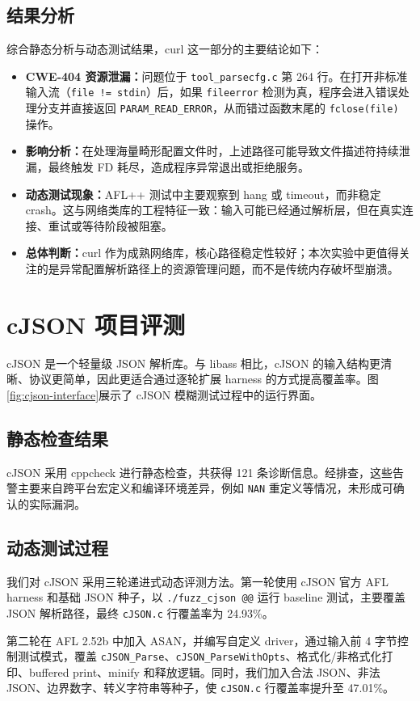 \documentclass[UTF8,a4paper,zihao=-4]{ctexart}
\begin{document}
\subsection{结果分析}
综合静态分析与动态测试结果，curl 这一部分的主要结论如下：
\begin{itemize}[leftmargin=2em]
  \item \textbf{CWE-404 资源泄漏：}问题位于 \texttt{tool\_parsecfg.c} 第 264 行。在打开非标准输入流（\texttt{file != stdin}）后，如果 \texttt{fileerror} 检测为真，程序会进入错误处理分支并直接返回 \texttt{PARAM\_READ\_ERROR}，从而错过函数末尾的 \texttt{fclose(file)} 操作。
  \item \textbf{影响分析：}在处理海量畸形配置文件时，上述路径可能导致文件描述符持续泄漏，最终触发 FD 耗尽，造成程序异常退出或拒绝服务。
  \item \textbf{动态测试现象：}AFL++ 测试中主要观察到 hang 或 timeout，而非稳定 crash。这与网络类库的工程特征一致：输入可能已经通过解析层，但在真实连接、重试或等待阶段被阻塞。
  \item \textbf{总体判断：}curl 作为成熟网络库，核心路径稳定性较好；本次实验中更值得关注的是异常配置解析路径上的资源管理问题，而不是传统内存破坏型崩溃。
\end{itemize}

\section{cJSON 项目评测}
cJSON 是一个轻量级 JSON 解析库。与 libass 相比，cJSON 的输入结构更清晰、协议更简单，因此更适合通过逐轮扩展 harness 的方式提高覆盖率。图\ref{fig:cjson-interface}展示了 cJSON 模糊测试过程中的运行界面。

\subsection{静态检查结果}
cJSON 采用 cppcheck 进行静态检查，共获得 121 条诊断信息。经排查，这些告警主要来自跨平台宏定义和编译环境差异，例如 \texttt{NAN} 重定义等情况，未形成可确认的实际漏洞。

\subsection{动态测试过程}
我们对 cJSON 采用三轮递进式动态评测方法。第一轮使用 cJSON 官方 AFL harness 和基础 JSON 种子，以 \texttt{./fuzz\_cjson @@} 运行 baseline 测试，主要覆盖 JSON 解析路径，最终 \texttt{cJSON.c} 行覆盖率为 24.93\%。

第二轮在 AFL 2.52b 中加入 ASAN，并编写自定义 driver，通过输入前 4 字节控制测试模式，覆盖 \texttt{cJSON\_Parse}、\texttt{cJSON\_ParseWithOpts}、格式化/非格式化打印、buffered print、minify 和释放逻辑。同时，我们加入合法 JSON、非法 JSON、边界数字、转义字符串等种子，使 \texttt{cJSON.c} 行覆盖率提升至 47.01\%。
\end{document}
